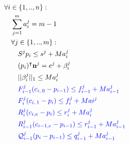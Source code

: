 \begin{align}
                            \quad & \forall i \in \{1,..,n\} : \nonumber\\
                                \quad & \quad \sum_{j=1}^{m} a_i^j = m-1  \nonumber\\
                                \quad & \quad \forall j \in \{1,..,m\} : \nonumber\\
                                    \quad & \quad \quad S^j p_i \leq s^j + M a_i^j  \nonumber\\
                                    \quad & \quad \quad (p_i)^{\intercal} \textbf{n}^j = e^j + \beta_i^j \nonumber\\
                                    \quad & \quad \quad ||\beta_i^j||_1 \leq M a_i^j \nonumber\\
                                    \quad & \quad \quad \textcolor{blue}{F^{j}_{i-1} (c_{i,\:0}-p_{i-1}) \leq  f_{i-1}^{j} + M a_{i-1}^{j} } \nonumber\\
                                    \quad & \quad \quad \textcolor{blue}{F^{j}_{i} (c_{i,\:1}-p_{i}) \leq  f^j_{i} + M a{i}^{j} }  \nonumber\\
                                    \quad & \quad \quad \textcolor{blue}{R_{i}^j (c_{i,e} - p_{i}) \leq r_i^j + M a_i^j }  \nonumber\\
                                    \quad & \quad \quad \textcolor{blue}{R_{i-1}^j (c_{i-1,e} - p_{i-1}) \leq r_{i-1}^j + M a_{i-1}^j } \nonumber\\
                                    \quad & \quad \quad \textcolor{blue}{\mathcal{Q}_{i-1}^j (p_i - p_{i-1}) \leq q_{i-1}^j + M a_{i-1}^j} \nonumber
\end{align}